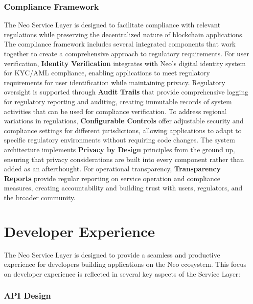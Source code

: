 \documentclass[11pt]{article}
\begin{document}
\subsubsection{Compliance Framework}
\label{subsubsec:compliance-framework}

The Neo Service Layer is designed to facilitate compliance with relevant regulations while preserving the decentralized nature of blockchain applications. The compliance framework includes several integrated components that work together to create a comprehensive approach to regulatory requirements. For user verification, \textbf{Identity Verification} integrates with Neo's digital identity system for KYC/AML compliance, enabling applications to meet regulatory requirements for user identification while maintaining privacy. Regulatory oversight is supported through \textbf{Audit Trails} that provide comprehensive logging for regulatory reporting and auditing, creating immutable records of system activities that can be used for compliance verification. To address regional variations in regulations, \textbf{Configurable Controls} offer adjustable security and compliance settings for different jurisdictions, allowing applications to adapt to specific regulatory environments without requiring code changes. The system architecture implements \textbf{Privacy by Design} principles from the ground up, ensuring that privacy considerations are built into every component rather than added as an afterthought. For operational transparency, \textbf{Transparency Reports} provide regular reporting on service operation and compliance measures, creating accountability and building trust with users, regulators, and the broader community.

\section{Developer Experience}
\label{subsec:nsl-developer}

The Neo Service Layer is designed to provide a seamless and productive experience for developers building applications on the Neo ecosystem. This focus on developer experience is reflected in several key aspects of the Service Layer:

\subsubsection{API Design}
\label{subsubsec:api-design}
\end{document}
